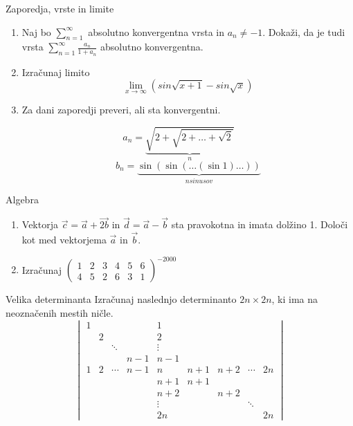 \begin{frame}{Zaporedja, vrste in limite}
	\begin{enumerate}
		\item 
		Naj bo \(\sum_{n = 1}^{\infty}\)   absolutno konvergentna vrsta in $a_n \ne -1$.
		Dokaži, da je tudi vrsta $\sum_{n=1}^\infty \frac{a_n}{1+a_n}$
		absolutno konvergentna.

		\item
		Izračunaj limito
		\[\lim_{x \to \infty} (sin \sqrt{x+1} - sin \sqrt{x})\]
		

		\item
		Za dani zaporedji preveri, ali sta konvergentni.
		
		\[\displaystyle a_n = \underbrace{\sqrt{2+\sqrt{2+\dots+\sqrt{2}}}}_{\text{$n$}} \qquad\] 
		\[b_n = \underbrace{\sin(\sin(\dots(\sin 1)\dots))}_{\text{$n sinusov$}}\]
 

	\end{enumerate}
\end{frame}

\begin{frame}{Algebra}
	\begin{enumerate}
		\item
		Vektorja $\vec{c}= \vec{a} + \vec{2b}$ in $\vec{d}= \vec{a}-\vec{b}$
		sta pravokotna in imata dolžino 1. Določi kot med vektorjema $\vec{a}$ in $\vec{b}$.
		\item 
		Izračunaj
		${\begin{pmatrix}
			1 & 2 & 3 & 4 & 5 & 6\\
            4 & 5 & 2 & 6 & 3 & 1
		\end{pmatrix}}^{-2000}$
	\end{enumerate}
\end{frame}

\begin{frame}{Velika determinanta}
	Izračunaj naslednjo determinanto $2n \times 2n$, ki ima na neoznačenih mestih ničle.
	$$\begin{vmatrix}
		1 &  & & & 1& & & & \\
		&  2 & & & 2 & & & &    \\
		&  & \ddots & & \vdots & & & &     \\
		& &  & n-1 & n-1 & & & &     \\
		1 & 2 & \cdots & n-1& n & n+1& n+2& \cdots   & 2n      \\
		& & &  & n+1 & n+1 & & &     \\
		& &  & & n+2 & & n+2 & &     \\
		& & &  & \vdots& & & \ddots &     \\
		& &  & & 2n & & & & 2n     
    \end{vmatrix}$$
\end{frame}

